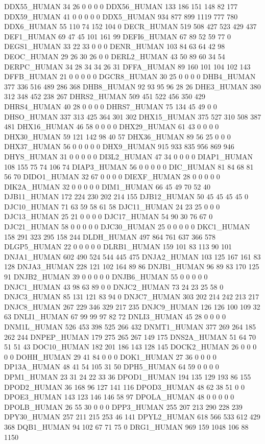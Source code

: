 DDX55_HUMAN	34	26	0	0	0	0
DDX56_HUMAN	133	186	151	148	82	177
DDX59_HUMAN	41	0	0	0	0	0
DDX5_HUMAN	934	877	899	1119	777	780
DDX6_HUMAN	55	110	74	152	104	0
DECR_HUMAN	519	508	427	523	429	437
DEF1_HUMAN	69	47	45	101	161	99
DEFI6_HUMAN	67	89	52	59	77	0
DEGS1_HUMAN	33	22	33	0	0	0
DENR_HUMAN	103	84	63	64	42	98
DEOC_HUMAN	29	26	30	26	0	0
DERL2_HUMAN	43	50	89	60	34	54
DERPC_HUMAN	34	28	34	34	26	31
DFFA_HUMAN	89	160	101	104	102	143
DFFB_HUMAN	21	0	0	0	0	0
DGCR8_HUMAN	30	25	0	0	0	0
DHB4_HUMAN	377	336	516	489	286	368
DHB8_HUMAN	92	93	95	96	28	26
DHE3_HUMAN	380	312	348	452	238	267
DHRS2_HUMAN	509	451	522	456	350	429
DHRS4_HUMAN	40	28	0	0	0	0
DHRS7_HUMAN	75	134	45	49	0	0
DHSO_HUMAN	337	313	425	364	301	302
DHX15_HUMAN	375	527	310	508	387	481
DHX16_HUMAN	46	58	0	0	0	0
DHX29_HUMAN	61	43	0	0	0	0
DHX30_HUMAN	59	121	142	98	40	57
DHX36_HUMAN	89	56	25	0	0	0
DHX37_HUMAN	56	0	0	0	0	0
DHX9_HUMAN	915	933	835	956	869	946
DHYS_HUMAN	31	0	0	0	0	0
DI3L2_HUMAN	47	34	0	0	0	0
DIAP1_HUMAN	108	155	75	74	106	74
DIAP3_HUMAN	56	0	0	0	0	0
DIC_HUMAN	81	84	68	81	56	70
DIDO1_HUMAN	32	67	0	0	0	0
DIEXF_HUMAN	28	0	0	0	0	0
DIK2A_HUMAN	32	0	0	0	0	0
DIM1_HUMAN	66	45	49	70	52	40
DJB11_HUMAN	172	224	230	202	214	155
DJB12_HUMAN	50	45	45	45	45	0
DJC10_HUMAN	71	63	59	58	61	58
DJC11_HUMAN	24	23	25	0	0	0
DJC13_HUMAN	25	21	0	0	0	0
DJC17_HUMAN	54	90	30	76	67	0
DJC21_HUMAN	58	0	0	0	0	0
DJC30_HUMAN	25	0	0	0	0	0
DKC1_HUMAN	158	291	323	295	158	244
DLDH_HUMAN	497	864	761	637	366	578
DLGP5_HUMAN	22	0	0	0	0	0
DLRB1_HUMAN	159	101	83	113	90	101
DNJA1_HUMAN	602	490	524	544	445	475
DNJA2_HUMAN	103	125	167	161	83	128
DNJA3_HUMAN	228	121	102	164	89	86
DNJB1_HUMAN	96	89	83	170	125	91
DNJB2_HUMAN	39	0	0	0	0	0
DNJB6_HUMAN	55	0	0	0	0	0
DNJC1_HUMAN	43	98	63	89	0	0
DNJC2_HUMAN	73	24	23	25	58	0
DNJC3_HUMAN	85	131	121	83	94	0
DNJC7_HUMAN	303	202	214	242	213	217
DNJC8_HUMAN	267	229	346	329	217	235
DNJC9_HUMAN	126	126	100	109	32	63
DNLI1_HUMAN	67	99	99	97	82	72
DNLI3_HUMAN	45	28	0	0	0	0
DNM1L_HUMAN	526	453	398	525	266	432
DNMT1_HUMAN	377	269	264	185	262	244
DNPEP_HUMAN	179	275	265	267	149	175
DNS2A_HUMAN	51	64	70	51	51	43
DOC10_HUMAN	182	201	186	143	128	145
DOCK2_HUMAN	26	0	0	0	0	0
DOHH_HUMAN	29	41	84	0	0	0
DOK1_HUMAN	27	36	0	0	0	0
DP13A_HUMAN	48	41	54	105	31	50
DPH5_HUMAN	64	59	0	0	0	0
DPM1_HUMAN	23	31	24	22	33	36
DPOD1_HUMAN	194	135	129	193	86	155
DPOD2_HUMAN	36	168	96	127	141	116
DPOD3_HUMAN	48	62	38	51	0	0
DPOE3_HUMAN	143	123	146	146	58	97
DPOLA_HUMAN	48	0	0	0	0	0
DPOLB_HUMAN	26	55	30	0	0	0
DPP3_HUMAN	255	207	213	290	228	239
DPY30_HUMAN	257	211	215	253	46	141
DPYL2_HUMAN	618	566	533	612	429	368
DQB1_HUMAN	94	102	67	71	75	0
DRG1_HUMAN	969	159	1048	106	88	1150
